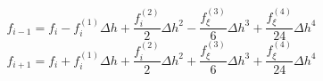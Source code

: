 \begin{equation} 
f_{{i-1}} = f_{i} - f^{{(1)}}_{i} {\Delta h} + \frac{f^{{(2)}}_{i}}{2} {\Delta h}^{2} - \frac{f^{{(3)}}_{{\xi}}}{6} {\Delta h}^{3} + \frac{f^{{(4)}}_{{\xi}}}{24} {\Delta h}^{4}
 \end{equation} 
\begin{equation} 
f_{{i+1}} = f_{i} + f^{{(1)}}_{i} {\Delta h} + \frac{f^{{(2)}}_{i}}{2} {\Delta h}^{2} + \frac{f^{{(3)}}_{{\xi}}}{6} {\Delta h}^{3} + \frac{f^{{(4)}}_{{\xi}}}{24} {\Delta h}^{4}
 \end{equation} 
